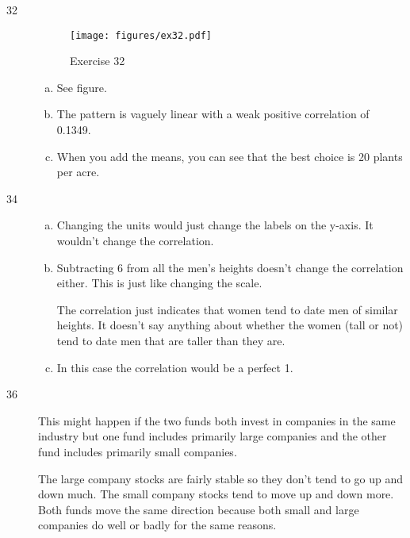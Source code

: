\documentclass[letterpaper, landscape]{exam}
\begin{document}
\begin{description}
      \item[32]
        \begin{figure}[H]
          \centering
          \texttt{[image: figures/ex32.pdf]}
          \caption{Exercise 32}
        \end{figure}\label{fig:ex32}

        \begin{enumerate}[(a)]
          \item See figure.

          \item The pattern is vaguely linear with a weak positive correlation
            of 0.1349.

          \item When you add the means, you can see that the best choice is 20
            plants per acre.

        \end{enumerate}

      \item[34]
        \begin{enumerate}[(a)]
          \item Changing the units would just change the labels on the y-axis.  It
          wouldn't change the correlation.  

          \item Subtracting 6 from all the men's heights doesn't change the
            correlation either.  This is just like changing the scale.

          The correlation just indicates that women tend to date men of similar
          heights.  It doesn't say anything about whether the women (tall or not)
          tend to date men that are taller than they are.

          \item In this case the correlation would be a perfect 1.
        \end{enumerate}

      \item[36] This might happen if the two funds both invest in companies in
        the same industry but one fund includes primarily large companies and
        the other fund includes primarily small companies.  
        
        The large company stocks are fairly stable so they don't tend to go up
        and down much.  The small company stocks tend to move up and down more.
        Both funds move the same direction because both small and large
        companies do well or badly for the same reasons.


\end{description}
\end{document}
